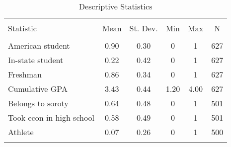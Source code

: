
\begin{table}[!htbp] \centering 
  \caption{Descriptive Statistics} 
  \label{} 
\begin{tabular}{@{\extracolsep{5pt}}lccccc} 
\\[-1.8ex]\hline 
\hline \\[-1.8ex] 
Statistic & \multicolumn{1}{c}{Mean} & \multicolumn{1}{c}{St. Dev.} & \multicolumn{1}{c}{Min} & \multicolumn{1}{c}{Max} & \multicolumn{1}{c}{N} \\ 
\hline \\[-1.8ex] 
American student & 0.90 & 0.30 & 0 & 1 & 627 \\ 
In-state student & 0.22 & 0.42 & 0 & 1 & 627 \\ 
Freshman & 0.86 & 0.34 & 0 & 1 & 627 \\ 
Cumulative GPA & 3.43 & 0.44 & 1.20 & 4.00 & 627 \\ 
Belongs to soroty & 0.64 & 0.48 & 0 & 1 & 501 \\ 
Took econ in high school & 0.58 & 0.49 & 0 & 1 & 501 \\ 
Athlete & 0.07 & 0.26 & 0 & 1 & 500 \\ 
\hline \\[-1.8ex] 
\end{tabular} 
\end{table} 
